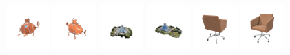 \begin{figure}[htbp]
  \includegraphics[width=0.15\textwidth]{images/data/samples/13.1.jpeg}\hspace{0.01\textwidth}%
  \includegraphics[width=0.15\textwidth]{images/data/samples/13.2.jpeg}\hfill
  \includegraphics[width=0.15\textwidth]{images/data/samples/14.1.jpeg}\hspace{0.01\textwidth}%
  \includegraphics[width=0.15\textwidth]{images/data/samples/14.2.jpeg}\hfill
  \includegraphics[width=0.15\textwidth]{images/data/samples/15.1.jpeg}\hspace{0.01\textwidth}%
  \includegraphics[width=0.15\textwidth]{images/data/samples/15.2.jpeg}\\\\
  \vspace{2mm}


\end{figure}
